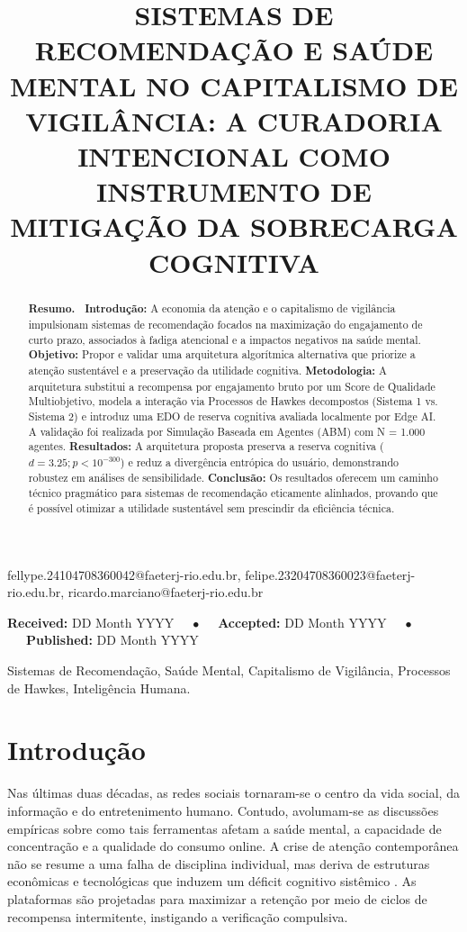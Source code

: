 \documentclass{sbc2023}
\title[Sistemas de Recomenda{\c c}{\~a}o e Sa{\'u}de Mental]{SISTEMAS DE RECOMENDA{\c C}{\~A}O E SA{\'U}DE MENTAL NO CAPITALISMO DE VIGIL{\^A}NCIA: A CURADORIA INTENCIONAL COMO INSTRUMENTO DE MITIGA{\c C}{\~A}O DA SOBRECARGA COGNITIVA}
\author[Melo, Farias \& Marciano]{
\affil{\textbf{Fellype Samuel}~\href{https://orcid.org/0000-0000-0000-0000}{\textcolor{orcidlogo}{\aiOrcid}}~[~\textbf{FAETERJ-RIO de Quintino, RJ, Brasil}~]}
\affil{\textbf{Felipe Farias}~\href{https://orcid.org/0000-0000-0000-0000}{\textcolor{orcidlogo}{\aiOrcid}}~[~\textbf{FAETERJ-RIO de Quintino, RJ, Brasil}~]}
\affil{\textbf{Ricardo Marciano}~\href{https://orcid.org/0000-0000-0000-0000}{\textcolor{orcidlogo}{\aiOrcid}}~[~\textbf{FAETERJ-RIO de Quintino, RJ, Brasil}~]}
}
\begin{document}
\begin{frontmatter}
\maketitle

\begin{mail}
fellype.24104708360042@faeterj-rio.edu.br, felipe.23204708360023@faeterj-rio.edu.br, ricardo.marciano@faeterj-rio.edu.br
\end{mail}

\begin{dates}
\small{\textbf{Received:} DD Month YYYY~~~$\bullet$~~~\textbf{Accepted:} DD Month YYYY~~~$\bullet$~~~\textbf{Published:} DD Month YYYY}
\end{dates}

\begin{abstract}
\textbf{Resumo.~}
\noindent \textbf{Introdução:} A economia da atenção e o capitalismo de vigilância impulsionam sistemas de recomendação focados na maximização do engajamento de curto prazo, associados à fadiga atencional e a impactos negativos na saúde mental. \textbf{Objetivo:} Propor e validar uma arquitetura algorítmica alternativa que priorize a atenção sustentável e a preservação da utilidade cognitiva. \textbf{Metodologia:} A arquitetura substitui a recompensa por engajamento bruto por um Score de Qualidade Multiobjetivo, modela a interação via Processos de Hawkes decompostos (Sistema 1 vs. Sistema 2) e introduz uma EDO de reserva cognitiva avaliada localmente por Edge AI. A validação foi realizada por Simulação Baseada em Agentes (ABM) com N = 1.000 agentes. \textbf{Resultados:} A arquitetura proposta preserva a reserva cognitiva ($d = 3.25; p < 10^{-300}$) e reduz a divergência entrópica do usuário, demonstrando robustez em análises de sensibilidade. \textbf{Conclusão:} Os resultados oferecem um caminho técnico pragmático para sistemas de recomendação eticamente alinhados, provando que é possível otimizar a utilidade sustentável sem prescindir da eficiência técnica.
\end{abstract}

\begin{keywords}
Sistemas de Recomenda{\c c}{\~a}o, Sa{\'u}de Mental, Capitalismo de Vigil{\^a}ncia, Processos de Hawkes, Intelig{\^e}ncia Humana.
\end{keywords}

\end{frontmatter}

\section{Introdução}
Nas últimas duas décadas, as redes sociais tornaram-se o centro da vida social, da informação e do entretenimento humano. Contudo, avolumam-se as discussões empíricas sobre como tais ferramentas afetam a saúde mental, a capacidade de concentração e a qualidade do consumo online. A crise de atenção contemporânea não se resume a uma falha de disciplina individual, mas deriva de estruturas econômicas e tecnológicas que induzem um déficit cognitivo sistêmico \citep{hari2022}. As plataformas são projetadas para maximizar a retenção por meio de ciclos de recompensa intermitente, instigando a verificação compulsiva.
\end{document}
